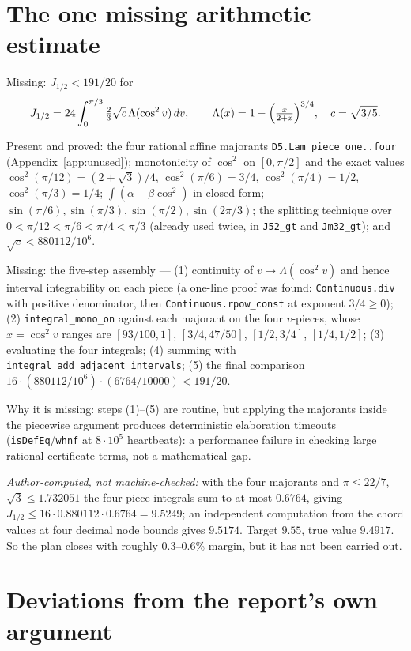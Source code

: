 \documentclass[11pt]{article}
\newcommand{\Ln}[1]{\texttt{#1}}
\begin{document}
\section{The one missing arithmetic estimate}
\label{sec:missing}

Missing: $J_{1/2}<191/20$ for
\[
J_{1/2}=24\int_0^{\pi/3}\tfrac23\sqrt c\,\Lambda(\cos^2 v)\,dv,\qquad
\Lambda(x)=1-\Bigl(\tfrac{x}{2+x}\Bigr)^{3/4},\quad c=\sqrt{3/5}.
\]

Present and proved: the four rational affine majorants \Ln{D5.Lam\_\allowbreak{}piece\_\allowbreak{}one..four}
(Appendix~\ref{app:unused}); monotonicity of $\cos^2$ on $[0,\pi/2]$ and the exact values
$\cos^2(\pi/12)=(2+\sqrt3)/4$, $\cos^2(\pi/6)=3/4$, $\cos^2(\pi/4)=1/2$, $\cos^2(\pi/3)=1/4$;
$\int(\alpha+\beta\cos^2)$ in closed form; $\sin(\pi/6),\sin(\pi/3),\sin(\pi/2),\sin(2\pi/3)$;
the splitting technique over $0<\pi/12<\pi/6<\pi/4<\pi/3$ (already used twice, in \Ln{J52\_\allowbreak{}gt}
and \Ln{Jm32\_\allowbreak{}gt}); and $\sqrt c<880112/10^6$.

Missing: the five-step assembly --- (1) continuity of $v\mapsto\Lambda(\cos^2 v)$ and hence
interval integrability on each piece (a one-line proof was found:
\Ln{Continuous.div} with positive denominator, then \Ln{Continuous.rpow\_\allowbreak{}const} at exponent
$3/4\ge0$); (2) \Ln{integral\_\allowbreak{}mono\_\allowbreak{}on} against each majorant on the four $v$-pieces, whose
$x=\cos^2 v$ ranges are $[93/100,1]$, $[3/4,47/50]$, $[1/2,3/4]$, $[1/4,1/2]$;
(3) evaluating the four integrals; (4) summing with
\Ln{integral\_\allowbreak{}add\_\allowbreak{}adjacent\_\allowbreak{}intervals}; (5) the final comparison
$16\cdot(880112/10^6)\cdot(6764/10000)<191/20$.

Why it is missing: steps (1)--(5) are routine, but applying the majorants inside the piecewise
argument produces deterministic elaboration timeouts (\Ln{isDefEq}/\Ln{whnf} at $8\cdot10^5$
heartbeats): a performance failure in checking large rational certificate terms, not a
mathematical gap.

\emph{Author-computed, not machine-checked:} with the four majorants and $\pi\le22/7$,
$\sqrt3\le1.732051$ the four piece integrals sum to at most $0.6764$, giving
$J_{1/2}\le16\cdot0.880112\cdot0.6764=9.5249$; an independent computation from the chord values
at four decimal node bounds gives $9.5174$. Target $9.55$, true value $9.4917$. So the plan
closes with roughly $0.3$--$0.6$\% margin, but it has not been carried out.

\section{Deviations from the report's own argument}
\label{sec:deviations}
\end{document}
